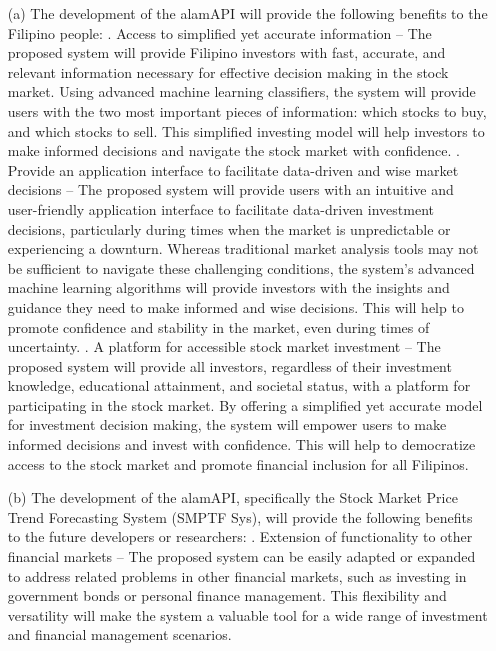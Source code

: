 \begin{itemize}
  \item[(a)] The development of the alamAPI will provide the 
  following benefits to the Filipino people:
  .	Access to simplified yet accurate information 
  – The proposed system will provide Filipino investors with fast, 
  accurate, and relevant information necessary for effective decision making 
  in the stock market. Using advanced machine learning classifiers, the system 
  will provide users with the two most important pieces of information: 
  which stocks to buy, and which stocks to sell. This simplified investing 
  model will help investors to make informed decisions and navigate the stock 
  market with confidence.
  .	Provide an application interface to facilitate data-driven 
  and wise market decisions – The proposed system will provide users with 
  an intuitive and user-friendly application interface to facilitate data-driven 
  investment decisions, particularly during times when the market is unpredictable 
  or experiencing a downturn. Whereas traditional market analysis tools may not 
  be sufficient to navigate these challenging conditions, the system's advanced 
  machine learning algorithms will provide investors with the insights and guidance 
  they need to make informed and wise decisions. This will help to promote 
  confidence and stability in the market, even during times of uncertainty.
  .	A platform for accessible stock market investment – 
  The proposed system will provide all investors, regardless of their 
  investment knowledge, educational attainment, and societal status, 
  with a platform for participating in the stock market. By offering a 
  simplified yet accurate model for investment decision making, the 
  system will empower users to make informed decisions and invest with confidence. 
  This will help to democratize access to the stock market and promote financial 
  inclusion for all Filipinos.
  \item[(b)] The development of the alamAPI, specifically the Stock Market Price 
  Trend Forecasting System (SMPTF Sys), will provide the following benefits 
  to the future developers or researchers:
  .	Extension of functionality to other financial markets 
  – The proposed system can be easily adapted or expanded to address 
  related problems in other financial markets, such as investing in
  government bonds or personal finance management. 
  This flexibility and versatility will make the system a valuable tool 
  for a wide range of investment and financial management scenarios.

\end{itemize}
